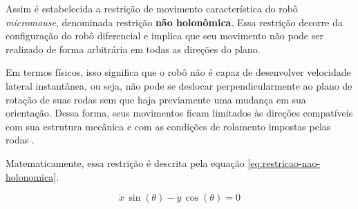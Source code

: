 		Assim é estabelecida a restrição de movimento característica do robô \textit{micromouse}, denominada restrição \textbf{não holonômica}. Essa restrição decorre da configuração do robô diferencial e implica que seu movimento não pode ser realizado de forma arbitrária em todas as direções do plano. 
		
		Em termos físicos, isso significa que o robô não é capaz de desenvolver velocidade lateral instantânea, ou seja, não pode se deslocar perpendicularmente ao plano de rotação de suas rodas sem que haja previamente uma mudança em sua orientação. Dessa forma, seus movimentos ficam limitados às direções compatíveis com sua estrutura mecânica e com as condições de rolamento impostas pelas rodas \cite{vieira-2005}. 
		
		Matematicamente, essa restrição é descrita pela equação \ref{eq:restricao-nao-holonomica}.
		
		\begin{equation}
			\label{eq:restricao-nao-holonomica}
			\dot{x}\,\sin(\theta) - \dot{y}\,\cos(\theta) = 0
		\end{equation}
